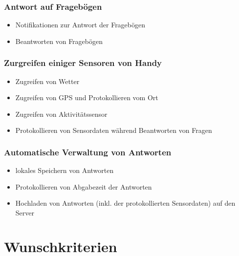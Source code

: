 \documentclass[a4paper]{scrreprt}
\begin{document}
                \subsubsection{Antwort auf Frageb\"ogen}
                    \begin{itemize}
                        \item Notifikationen zur Antwort der Frageb\"ogen
                        \item Beantworten von Frageb\"ogen 
                    \end{itemize}

                \subsubsection{Zurgreifen einiger Sensoren von Handy}
                    \begin{itemize}
                        \item Zugreifen von Wetter
                        \item Zugreifen von GPS und Protokollieren vom Ort
                        \item Zugreifen von Aktivitätssensor
                        \item Protokollieren von Sensordaten w\"ahrend Beantworten von Fragen 
                    \end{itemize}

                \subsubsection{Automatische Verwaltung von Antworten}
                    \begin{itemize}
                        \item lokales Speichern von Antworten
                        \item Protokollieren von Abgabezeit der Antworten
                        \item Hochladen von Antworten (inkl. der protokollierten Sensordaten) auf den Server
                    \end{itemize}


                \vspace*{0.5cm}


        \section{Wunschkriterien}
\end{document}
